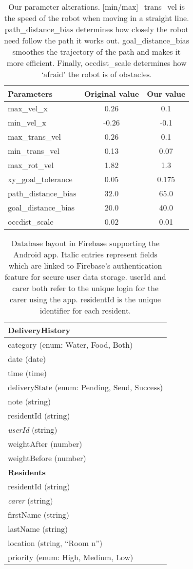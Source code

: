 \documentclass{article}
\begin{document}
\begin{table}[h]
\vskip 3mm
\begin{center}
\begin{tabular}{lcc}
\hline
\abovespace\belowspace
Parameters & Original value & Our value \\
\hline
  max\_vel\_x & 0.26 & 0.1 \\
  min\_vel\_x & -0.26 & -0.1 \\
  max\_trans\_vel & 0.26 & 0.1 \\
  min\_trans\_vel & 0.13 & 0.07 \\
  max\_rot\_vel & 1.82 & 1.3 \\
  xy\_goal\_tolerance & 0.05 & 0.175 \\
  path\_distance\_bias & 32.0 & 65.0 \\
  goal\_distance\_bias & 20.0 & 40.0 \\
  occdist\_scale & 0.02 & 0.01
\end{tabular}
\caption{Our parameter alterations. [min/max]\_trans\_vel is the speed of the robot when moving in a straight line. path\_distance\_bias determines how closely the robot need follow the path it works out. goal\_distance\_bias smoothes the trajectory of the path and makes it more efficient. Finally, occdist\_scale determines how `afraid' the robot is of obstacles.}
\label{tab:params}
\end{center}
\vskip -3mm
\end{table}
\begin{table}[h]
  \begin{tabular}{|l|}
    \hline
    {\bf DeliveryHistory} \\
    \hline
    category (enum: Water, Food, Both) \\
    date (date) \\
    time (time) \\
    deliveryState (enum: Pending, Send, Success) \\
    note (string) \\
    residentId (string) \\
    {\it userId} (string) \\
    weightAfter (number) \\
    weightBefore (number) \\
    \hline
    {\bf Residents} \\
    \hline
    residentId (string) \\
    {\it carer} (string) \\
    firstName (string) \\
    lastName (string) \\
    location (string, ``Room n'') \\
    priority (enum: High, Medium, Low) \\
    \hline
  \end{tabular}
  \caption{Database layout in Firebase supporting the Android app. Italic entries represent fields which are linked to Firebase's authentication feature for secure user data storage. userId and carer both refer to the unique login for the carer using the app. residentId is the unique identifier for each resident. }
  \label{tab:firebase}         
\end{table}
\clearpage

\end{document}
